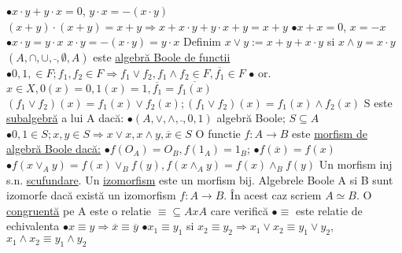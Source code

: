 \documentclass[8pt,twocolumn]{extarticle}
\begin{document}
	$\bullet x \cdot y  + y \cdot x = 0$, $y \cdot x = - (x \cdot y)$ \newline
	$(x + y) \cdot (x + y) = x + y \Rightarrow x + x \cdot y + y \cdot x + y = x + y$ \newline
	$\bullet x + x = 0$, $x = -x$ \newline
	$\bullet x \cdot y = y \cdot x$ \newline
	$x \cdot y = - (x \cdot y) = y \cdot x$ \newline
	Definim $x \vee y := x + y + x \cdot y$ si $x \wedge y = x \cdot y$ \newline
	$(A, \cap, \cup, \bar{ }, \emptyset, A)$ este \underline{algebră Boole de functii} \newline
	$\bullet 0, 1, \in F; f_{1}, f_{2} \in F \Rightarrow f_{1} \vee f_{2}, f_{1} \wedge f_{2} \in F, \overline{f_{1}} \in F$ \newline
	$\bullet$ or. $x \in X, 0(x) = 0, 1(x) = 1, \overline{f_{1}} = \overline{f_{1}(x)}$ \newline
	$(f_{1} \vee f_{2})(x) = f_{1}(x) \vee f_{2}(x); (f_{1} \vee f_{2})(x) = f_{1}(x) \wedge f_{2}(x)$ \newline
	S este \underline{subalgebră} a lui A dacă: \newline
	$\bullet (A, \vee, \wedge, \bar{ }, 0, 1)$ algebră Boole; $S \subseteq A$ \newline
	$\bullet 0, 1 \in S; x, y \in S \Rightarrow x \vee x, x \wedge y, \overline{x} \in S$ \newline
	O functie $f: A \rightarrow B$ este \underline{morfism de algebră Boole dacă:}
	$\bullet f(O_{A}) = O_{B}, f(1_{A}) = 1_{B}$; $\bullet f(\overline{x}) = f(x)$ \newline
	$\bullet f(x \vee _{A} y) = f(x) \vee _{B} f(y), f(x \wedge _{A} y) = f(x) \wedge _{B} f(y)$ \newline
	Un morfism inj s.n. \underline{scufundare}. Un \underline{izomorfism} este un morfism bij. \newline
	Algebrele Boole A si B sunt izomorfe dacă există un izomorfism $f: A \rightarrow B$. În acest caz scriem $A \simeq B$. \newline
	O \underline{congruentă} pe A este o relatie $\equiv \subseteq A x A$ care verifică \newline
	$\bullet \equiv$ este relatie de echivalenta \newline
	$\bullet x \equiv y \Rightarrow \overline{x} \equiv \overline{y}$ \newline
	$\bullet x_{1} \equiv y_{1}$ si $x_{2} \equiv y_{2} \Rightarrow x_{1} \vee x_{2} \equiv y_{1} \vee y_{2}$, $x_{1} \wedge x_{2} \equiv y_{1} \wedge y_{2}$ \newline
\end{document}
